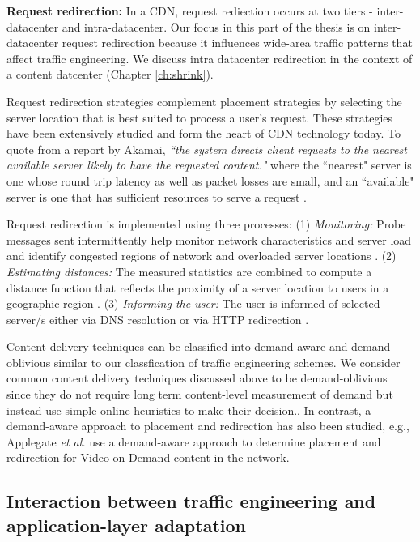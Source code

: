 \textbf{Request redirection:} In a CDN, request rediection occurs at two tiers - inter-datacenter and intra-datacenter. Our focus in this part of the thesis is on inter-datacenter request redirection because it influences wide-area traffic patterns that affect traffic engineering. We discuss intra datacenter redirection in the context of a content datcenter (Chapter \ref{ch:shrink}).

Request redirection strategies complement placement strategies by selecting the server location that is best suited to process a user's request. These strategies have been extensively studied and form the heart of CDN technology today. To quote from a report by Akamai,  \emph{``the system directs client requests to the nearest available server likely to have the requested content."} where the ``nearest" server is one whose round trip latency as well as packet losses are small, and  an ``available" server is one that has sufficient resources to serve a request \cite{DilleyMPPSW02}. 

Request redirection is implemented using three processes: (1) \emph{Monitoring:} Probe messages sent intermittently help monitor network characteristics and server load and identify congested regions of network and overloaded server locations \cite{oasis,donar}. (2) \emph{Estimating distances:} The measured statistics are combined to compute a distance function that reflects the proximity of a server location to users in a geographic region \cite{donar}. (3) \emph{Informing the user:} The user is informed of selected server/s either via DNS resolution \cite{DilleyMPPSW02} or via HTTP redirection \cite{barbir2003known}.

Content delivery techniques can be classified into demand-aware and demand-oblivious similar to our classfication of traffic engineering schemes. We consider common content delivery techniques discussed above to be demand-oblivious since they do not require long term content-level measurement of demand but instead use simple online heuristics to make their decision.. In contrast, a demand-aware approach to  placement and redirection has also been studied, e.g., Applegate \emph{et al.} \cite{ATTVoD} use a demand-aware approach to determine placement and redirection for Video-on-Demand content in the network. 

\subsection{Interaction between traffic engineering and application-layer adaptation}
\label{sec:ch2-te-cdn}

